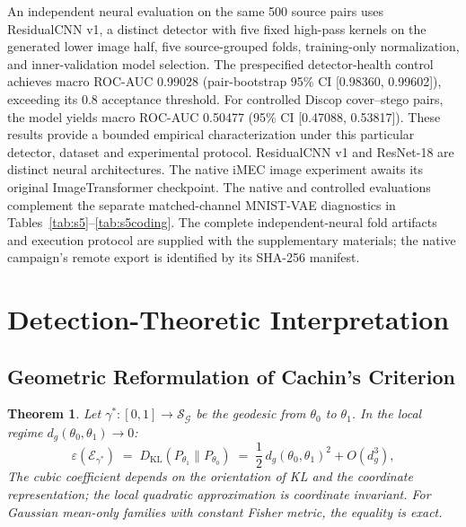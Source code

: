 \documentclass[a4paper,fleqn]{cas-dc}
\newtheorem{theorem}{Theorem}
\newcommand{\calS}{\mathcal{S}}
\newcommand{\calG}{\mathcal{G}}
\newcommand{\DKL}{D_{\mathrm{KL}}}
\begin{document}
An independent neural evaluation on the same 500 source pairs uses
ResidualCNN v1, a distinct detector with five fixed high-pass kernels
on the generated lower image half, five source-grouped folds,
training-only normalization, and inner-validation model selection.
The prespecified detector-health control achieves macro ROC-AUC
0.99028 (pair-bootstrap 95\% CI [0.98360, 0.99602]), exceeding
its 0.8 acceptance threshold. For controlled Discop cover--stego pairs,
the model yields macro ROC-AUC 0.50477 (95\% CI [0.47088, 0.53817]).
These results provide a bounded empirical characterization under this
particular detector, dataset and experimental protocol.
ResidualCNN v1 and ResNet-18 are distinct neural architectures.
The native iMEC image experiment awaits its original ImageTransformer
checkpoint. The native and controlled evaluations complement the
separate matched-channel MNIST-VAE diagnostics in
Tables~\ref{tab:s5}--\ref{tab:s5coding}.
The complete independent-neural fold artifacts and execution protocol
are supplied with the supplementary materials; the native campaign's
remote export is identified by its SHA-256 manifest.


\section{Detection-Theoretic Interpretation}
\label{sec:security}

\subsection{Geometric Reformulation of Cachin's Criterion}

\begin{theorem}%
  \label{thm:geometric_security}
  Let $\gamma^*:[0,1]\to\calS_{\calG}$ be the geodesic from $\theta_0$
  to $\theta_1$.  In the local regime $d_g(\theta_0,\theta_1)\to 0$:
  \begin{equation}
    \varepsilon(\mathcal{E}_{\gamma^*})
    \;=\; \DKL(P_{\theta_1}\|P_{\theta_0})
    \;=\; \frac{1}{2}\,d_g(\theta_0,\theta_1)^2
    + O(d_g^3),
    \label{eq:geometric_security_approx}
  \end{equation}
  The cubic coefficient depends on the orientation of KL and the
  coordinate representation; the local quadratic approximation is
  coordinate invariant. For Gaussian mean-only families with constant
  Fisher metric, the equality is exact.
\end{theorem}
\end{document}
